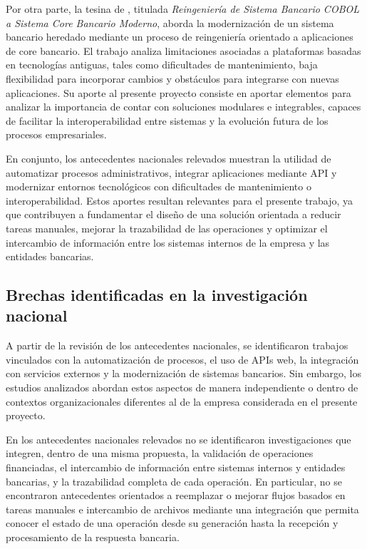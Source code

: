 Por otra parte, la tesina de \citet{barrera2023}, titulada \emph{Reingeniería de Sistema Bancario COBOL a Sistema Core Bancario Moderno}, aborda la modernización de un sistema bancario heredado mediante un proceso de reingeniería orientado a aplicaciones de core bancario. El trabajo analiza limitaciones asociadas a plataformas basadas en tecnologías antiguas, tales como dificultades de mantenimiento, baja flexibilidad para incorporar cambios y obstáculos para integrarse con nuevas aplicaciones. Su aporte al presente proyecto consiste en aportar elementos para analizar la importancia de contar con soluciones modulares e integrables, capaces de facilitar la interoperabilidad entre sistemas y la evolución futura de los procesos empresariales.

En conjunto, los antecedentes nacionales relevados muestran la utilidad de automatizar procesos administrativos, integrar aplicaciones mediante API y modernizar entornos tecnológicos con dificultades de mantenimiento o interoperabilidad. Estos aportes resultan relevantes para el presente trabajo, ya que contribuyen a fundamentar el diseño de una solución orientada a reducir tareas manuales, mejorar la trazabilidad de las operaciones y optimizar el intercambio de información entre los sistemas internos de la empresa y las entidades bancarias.

\subsection{Brechas identificadas en la investigación nacional}

A partir de la revisión de los antecedentes nacionales, se identificaron trabajos vinculados con la automatización de procesos, el uso de APIs web, la integración con servicios externos y la modernización de sistemas bancarios. Sin embargo, los estudios analizados abordan estos aspectos de manera independiente o dentro de contextos organizacionales diferentes al de la empresa considerada en el presente proyecto.

En los antecedentes nacionales relevados no se identificaron investigaciones que integren, dentro de una misma propuesta, la validación de operaciones financiadas, el intercambio de información entre sistemas internos y entidades bancarias, y la trazabilidad completa de cada operación. En particular, no se encontraron antecedentes orientados a reemplazar o mejorar flujos basados en tareas manuales e intercambio de archivos mediante una integración que permita conocer el estado de una operación desde su generación hasta la recepción y procesamiento de la respuesta bancaria.

